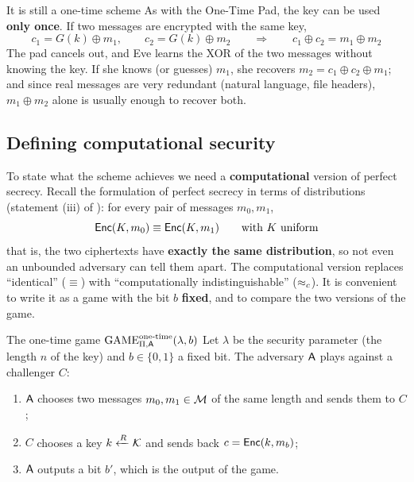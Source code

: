 \begin{framedobs}{It is still a one-time scheme}
  As with the One-Time Pad, the key can be used \textbf{only once}. If two messages are encrypted with the same key,
  \[
    c_1 = G(k) \oplus m_1, \qquad c_2 = G(k) \oplus m_2 \qquad \Longrightarrow \qquad c_1 \oplus c_2 = m_1 \oplus m_2
  \]
  The pad cancels out, and Eve learns the XOR of the two messages without knowing the key. If she knows (or guesses) $m_1$, she recovers $m_2 = c_1 \oplus c_2 \oplus m_1$; and since real messages are very redundant (natural language, file headers), $m_1 \oplus m_2$ alone is usually enough to recover both.
\end{framedobs}

\subsection{Defining computational security}

To state what the scheme achieves we need a \textbf{computational} version of perfect secrecy. Recall the formulation of perfect secrecy in terms of distributions (statement (iii) of ): for every pair of messages $m_0, m_1$,
\[
  \mathsf{Enc}(K, m_0) \equiv \mathsf{Enc}(K, m_1) \qquad \text{with } K \text{ uniform}
\]
that is, the two ciphertexts have \textbf{exactly the same distribution}, so not even an unbounded adversary can tell them apart. The computational version replaces ``identical'' ($\equiv$) with ``computationally indistinguishable'' ($\approx_c$). It is convenient to write it as a game with the bit $b$ \textbf{fixed}, and to compare the two versions of the game.

\begin{frameddefn}[label={def:one-time-game}]{The one-time game $\mathrm{GAME}^{\text{one-time}}_{\Pi,\mathsf{A}}(\lambda, b)$}
  Let $\lambda$ be the security parameter (the length $n$ of the key) and $b \in \{0,1\}$ a fixed bit. The adversary $\mathsf{A}$ plays against a challenger $C$:
  \begin{enumerate}
    \item $\mathsf{A}$ chooses two messages $m_0, m_1 \in \mathcal{M}$ of the same length and sends them to $C$;
    \item $C$ chooses a key $k \xleftarrow{R} \mathcal{K}$ and sends back $c = \mathsf{Enc}(k, m_b)$;
    \item $\mathsf{A}$ outputs a bit $b'$, which is the output of the game.
  \end{enumerate}
\end{frameddefn}

